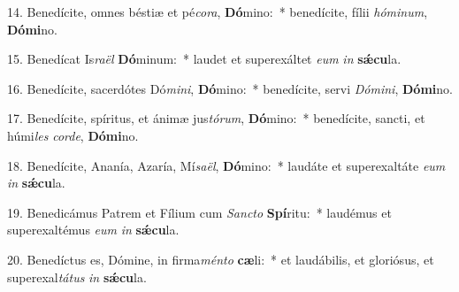 14. Benedícite, omnes béstiæ et pé\textit{co}\textit{ra}, \textbf{Dó}mino:~* benedícite, fílii \textit{hó}\textit{mi}\textit{num}, \textbf{Dó}\textbf{mi}no.

15. Benedícat Is\textit{ra}\textit{ël} \textbf{Dó}minum:~* laudet et superexáltet \textit{e}\textit{um} \textit{in} \textbf{s\'{\ae}}\textbf{cu}la.

16. Benedícite, sacerdótes Dó\textit{mi}\textit{ni}, \textbf{Dó}mino:~* benedícite, servi \textit{Dó}\textit{mi}\textit{ni}, \textbf{Dó}\textbf{mi}no.

17. Benedícite, spíritus, et ánimæ jus\textit{tó}\textit{rum}, \textbf{Dó}mino:~* benedícite, sancti, et húmi\textit{les} \textit{cor}\textit{de}, \textbf{Dó}\textbf{mi}no.

18. Benedícite, Ananía, Azaría, Mí\textit{sa}\textit{ël}, \textbf{Dó}mino:~* laudáte et superexaltáte \textit{e}\textit{um} \textit{in} \textbf{s\'{\ae}}\textbf{cu}la.

19. Benedicámus Patrem et Fílium cum \textit{Sanc}\textit{to} \textbf{Spí}ritu:~* laudémus et superexaltémus \textit{e}\textit{um} \textit{in} \textbf{s\'{\ae}}\textbf{cu}la.

20. Benedíctus es, Dómine, in firma\textit{mén}\textit{to} \textbf{cæ}li:~* et laudábilis, et gloriósus, et superexal\textit{tá}\textit{tus} \textit{in} \textbf{s\'{\ae}}\textbf{cu}la.
